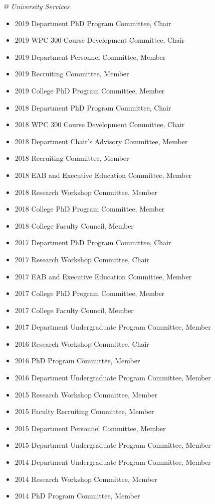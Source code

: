 \documentclass[paper=letter,fontsize=10pt]{scrartcl} %
\begin{document}
\noindent\textit{@ University Services}
\begin{itemize}
\item 2019 Department PhD Program Committee, Chair
\item 2019 WPC 300 Course Development Committee, Chair
\item 2019 Department Personnel Committee, Member
\item 2019 Recruiting Committee, Member
\item 2019 College PhD Program Committee, Member
\item 2018 Department PhD Program Committee, Chair
\item 2018 WPC 300 Course Development Committee, Chair
\item 2018 Department Chair's Advisory Committee, Member
\item 2018 Recruiting Committee, Member
\item 2018 EAB and Executive Education Committee, Member
\item 2018 Research Workshop Committee, Member
\item 2018 College PhD Program Committee, Member
\item 2018 College Faculty Council, Member
\item 2017 Department PhD Program Committee, Chair
\item 2017 Research Workshop Committee, Chair
\item 2017 EAB and Executive Education Committee, Member
\item 2017 College PhD Program Committee, Member
\item 2017 College Faculty Council, Member
\item 2017 Department Undergraduate Program Committee, Member
\item 2016 Research Workshop Committee, Chair
\item 2016 PhD Program Committee, Member
\item 2016 Department Undergraduate Program Committee, Member
\item 2015 Research Workshop Committee, Member
\item 2015 Faculty Recruiting Committee, Member
\item 2015 Department Personnel Committee, Member
\item 2015 Department Undergraduate Program Committee, Member
\item 2014 Department Undergraduate Program Committee, Member
\item 2014 Research Workshop Committee, Member
\item 2014 PhD Program Committee, Member
\end{itemize}
\end{document}
